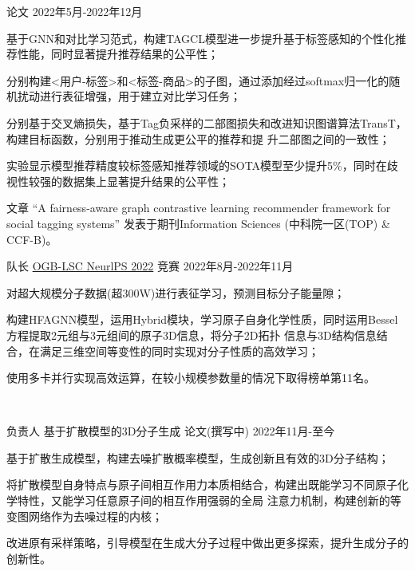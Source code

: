 \begin{cventries}
  {论文} %
  {2022年5月-2022年12月} %
  {
    \begin{cvitems} %
      \item {基于GNN和对比学习范式，构建TAGCL模型进一步提升基于标签感知的个性化推荐性能，同时显著提升推荐结果的公平性；}
      \item {分别构建<用户-标签>和<标签-商品>的子图，通过添加经过softmax归一化的随机扰动进行表征增强，用于建立对比学习任务；}
      \item {分别基于交叉熵损失，基于Tag负采样的二部图损失和改进知识图谱算法TransT，构建目标函数，分别用于推动生成更公平的推荐和提
      升二部图之间的一致性；}
      \item {实验显示模型推荐精度较标签感知推荐领域的SOTA模型至少提升5\%，同时在歧视性较强的数据集上显著提升结果的公平性；}
      \item {文章 “A fairness-aware graph contrastive learning recommender framework for social tagging systems” 发表于期刊Information Sciences (中科院一区(TOP) \& CCF-B)。}
    \end{cvitems}
  }
  
\cventry
  {队长} %
  {\href{https://ogb.stanford.edu/neurips2022/results/}{OGB-LSC NeurlPS 2022}} %
  {竞赛} %
  {2022年8月-2022年11月} %
  {
    \begin{cvitems} %
      \item {对超大规模分子数据(超300W)进行表征学习，预测目标分子能量隙；}
      \item {构建HFAGNN模型，运用Hybrid模块，学习原子自身化学性质，同时运用Bessel方程提取2元组与3元组间的原子3D信息，将分子2D拓扑
      信息与3D结构信息结合，在满足三维空间等变性的同时实现对分子性质的高效学习；}
      \item {使用多卡并行实现高效运算，在较小规模参数量的情况下取得榜单第11名。}
    \end{cvitems}
  }

\

\cventry
  {负责人} %
  {基于扩散模型的3D分子生成} %
  {论文(撰写中)} %
  {2022年11月-至今} %
  {
    \begin{cvitems} 
      \item {基于扩散生成模型，构建去噪扩散概率模型，生成创新且有效的3D分子结构；}
      \item {将扩散模型自身特点与原子间相互作用力本质相结合，构建出既能学习不同原子化学特性，又能学习任意原子间的相互作用强弱的全局
      注意力机制，构建创新的等变图网络作为去噪过程的内核；}
      \item {改进原有采样策略，引导模型在生成大分子过程中做出更多探索，提升生成分子的创新性。}
    \end{cvitems}
  }


\end{cventries}
